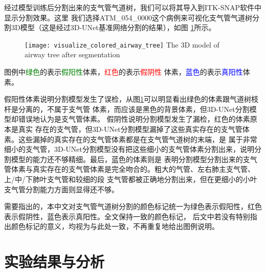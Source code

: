 经过模型训练后分割出来的支气管气道树，我们可以将其导入到ITK-SNAP\cite{Yushkevich2006ITKSNAP}软件中显示分割效果。这里
我们选择ATM\_054\_0000这个病例来可视化支气管气道树分割3D模型（这是经过3D-UNet基准网络分割的结果），如图
\ref{fig:airway_tree_model}所示。
\begin{figure}[!htp]
    \centering
    \texttt{[image: visualize\_colored\_airway\_tree]}
        {The 3D model of airway tree after segmentation}
    \label{fig:airway_tree_model}
\end{figure}
图例中\textcolor{green}{绿色}的表示\textcolor{green}{假阳性}体素，\textcolor{red}{红色}的表示\textcolor{red}{假阴性}
体素，\textcolor{blue}{蓝色}的表示\textcolor{blue}{真阳性}体素。

假阳性体素说明分割模型发生了误检，从图\ref{fig:airway_tree_model}可以明显看出绿色的体素跟气道树枝杆是分离的，不属于支气管
体素，而应该是黑色的背景体素，但3D-UNet分割模型却错误地认为是支气管体素。 假阴性说明分割模型发生了漏检，红色的体素原本是真实
存在的支气管，但3D-UNet分割模型漏掉了这些真实存在的支气管体素。这些漏掉的真实存在的支气管体素都是在支气管气道树的末端，是
属于非常细小的支气管，3D-UNet分割模型没有把这些细小的支气管体素分割出来，说明分割模型的能力还不够精细。最后，蓝色的体素则是
表明分割模型分割出来的支气管体素与真实存在的支气管体素是完全吻合的。粗大的气管、左右肺主支气管、上/中/下肺叶支气管和较细的段
支气管都被正确地分割出来，但在更细小的小叶支气管分割能力方面则显得还不够。

需要指出的，本中文对支气管气道树分割的颜色标记统一为绿色表示假阳性，红色表示假阴性，蓝色表示真阳性。全文保持一致的颜色标记，
后文中若没有特别指出颜色标记的意义，均视为与此处一致，不再重复地给出图例说明。

\section{实验结果与分析}\label{sec:baseline_experiment}
